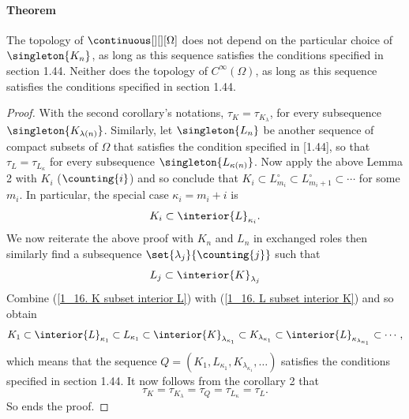 \paragraph{Theorem}
The topology of %
%
$\continuous[][][\Omega]$ %
%
does not depend on the particular choice of %
%
$\singleton{K_n}$, %
%
as long as this sequence satisfies the conditions specified in section 1.44. %
Neither does the topology of %
%
$C^{\infty}(\Omega)$, %
%
as long as this sequence satisfies the conditions specified in section 1.44. %
%
\begin{proof}%
With the second corollary's notations,
% 
  $\tau_{K} = \tau_{K_\lambda}$,
%
for every subsequence $\singleton{K_{\lambda(n)}}$.
% 
Similarly, let 
%
  $\singleton{L_n}$ 
% 
be another sequence of compact subsets of $\Omega$ that satisfies 
the condition specified in [1.44], 
so that 
%
  $\tau_{L} = \tau_{L_\kappa}$
%
for every subsequence $\singleton{L_{\kappa(n)}}$. 
%
Now apply the above Lemma 2 with $K_i$ ($\counting{i}$) and so conclude that  
%
  $K_i 
    \subset 
  L^\circ_{m_i} 
    \subset 
  L^\circ_{m_{i}+1}
    \subset
  \cdots$
%  
for some $m_i$. In particular, the special case $\kappa_i = m_i + i$ is 
%
  \begin{equation}
    \label{1_16. K subset interior L}
    K_i
      \subset 
    \interior{L}_{\kappa_i}.
  \end{equation} 
%
We now reiterate the above proof with $K_n$ and $L_n$ in exchanged roles 
then similarly find a subsequence $\set{\lambda_j}{\counting{j}}$ such that 
%
  \begin{equation}
  \label{1_16. L subset interior K}
    L_j \subset \interior{K}_{\lambda_j}
  \end{equation}
%
Combine 
%
  (\ref{1_16. K subset interior L}) with 
  (\ref{1_16. L subset interior K}) 
%
and so obtain
%
  \begin{equation}
    K_1 
      \subset 
    \interior{L}_{\kappa_1} 
      \subset 
    L_{\kappa_1} 
      \subset 
    \interior{K}_{\lambda_{\kappa_1}}
      \subset 
    K_{\lambda_{\kappa_1}}
      \subset
    \interior{L}_{\kappa_{\lambda_{\kappa_1}}}
      \subset
    \cdots, 
  \end{equation}
%
which means that the sequence 
%
  $Q = (
    K_1, 
    L_{\kappa_1}, 
    K_{\lambda_{\kappa_1}}, 
    \dots
  )$
%
satisfies the conditions specified in section 1.44. 
It now follows from the corollary 2 that 
%
  \begin{equation}  
    \tau_{K} 
    = 
      \tau_{K_\lambda} 
    = 
      \tau_{Q} 
    = 
      \tau_{L_\kappa} 
    = \tau_{L}.
  \end{equation} 
%
So ends the proof.
\end{proof}
